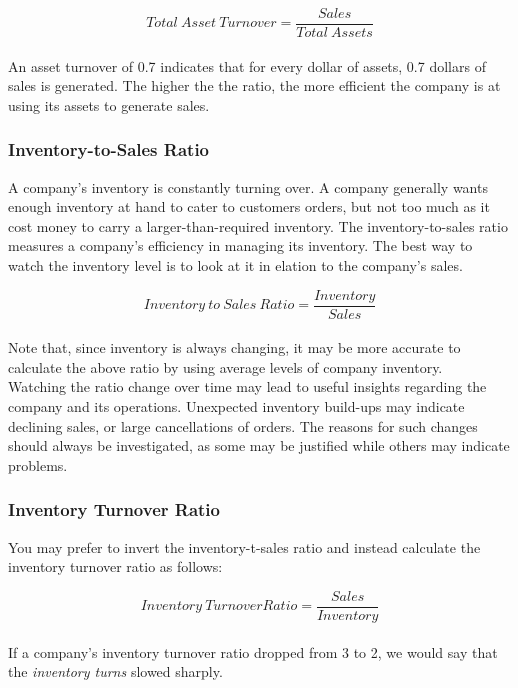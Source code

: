 \documentclass{article}
\begin{document}
 \begin{equation}
    Total\: Asset\:Turnover = \frac{Sales}{Total\: Assets} 
\end{equation}\\

An asset turnover of 0.7 indicates that for every dollar of assets, 0.7 dollars of sales is generated. The higher the the ratio, the more efficient the company is at using its assets to generate sales. 

\subsubsection{Inventory-to-Sales Ratio}
A company's inventory is constantly turning over. A company generally wants enough inventory at hand to cater to customers orders, but not too much as it cost money to carry a larger-than-required inventory. The inventory-to-sales ratio measures a company's efficiency in managing its inventory. The best way to watch the inventory level is to look at it in elation to the company's sales. 

\begin{equation}
    Inventory\:to\:Sales\: Ratio = \frac{Inventory}{Sales} 
\end{equation}\\

Note that, since inventory is always changing, it may be more accurate to calculate the above ratio by using average levels of company inventory. \\

Watching the ratio change over time may lead to useful insights regarding the company and its operations. Unexpected inventory build-ups may indicate declining sales, or large cancellations of orders. The reasons for such changes should always be investigated, as some may be justified while others may indicate problems. 

\subsubsection{Inventory Turnover Ratio}
You may prefer to invert the inventory-t-sales ratio and instead calculate the inventory turnover ratio as follows:

\begin{equation}
    Inventory\: Turnover Ratio = \frac{Sales}{Inventory} 
\end{equation}\\

If a company's inventory turnover ratio dropped from 3 to 2, we would say that the \textit{inventory turns} slowed sharply.\\
\end{document}
